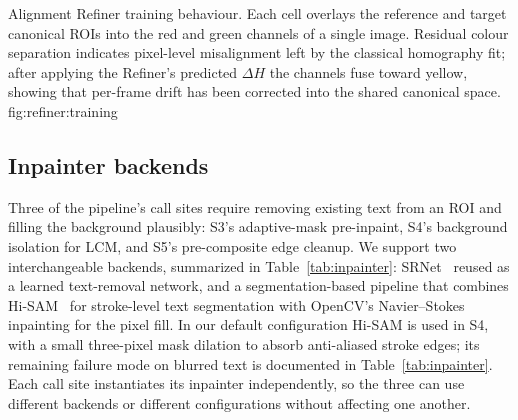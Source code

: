 %
  {Alignment Refiner training behaviour. Each cell overlays the
   reference and target canonical ROIs into the red and green
   channels of a single image. Residual colour separation indicates
   pixel-level misalignment left by the classical homography fit;
   after applying the Refiner's predicted $\Delta H$ the channels
   fuse toward yellow, showing that per-frame drift has been
   corrected into the shared canonical space.}%
  {fig:refiner:training}

\subsection{Inpainter backends}
\label{sec:method:inpainter}

Three of the pipeline's call sites require removing existing text
from an ROI and filling the background plausibly: S3's
adaptive-mask pre-inpaint, S4's background isolation for LCM, and
S5's pre-composite edge cleanup. We support two interchangeable
backends, summarized in Table~\ref{tab:inpainter}:
SRNet~\citep{wu2019srnet} reused as a learned text-removal
network, and a segmentation-based pipeline that combines
Hi-SAM~\citep{ye2024hisam} for stroke-level text segmentation with
OpenCV's Navier--Stokes inpainting for the pixel fill. In our
default configuration Hi-SAM is used in S4, with a small
three-pixel mask dilation to absorb anti-aliased stroke edges; its
remaining failure mode on blurred text is documented in
Table~\ref{tab:inpainter}. Each call site instantiates its
inpainter independently, so the three can use different backends
or different configurations without affecting one another.

